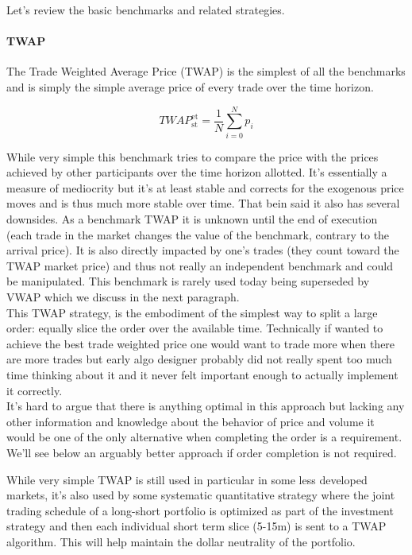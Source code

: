 Let's review the basic benchmarks and related strategies.

\paragraph{TWAP}
The Trade Weighted Average Price (TWAP) is the simplest of all the benchmarks and is simply the simple average price of every trade over the time horizon. 

\begin{equation}
	\mathit{TWAP}_{\text{st}} ^{\text{et}}= \frac{1}{N}\sum_{i=0}^N{p_i}
\end{equation}

While very simple this benchmark tries to compare the price with the prices achieved by other participants over the time horizon allotted. It's essentially a measure of mediocrity but it's at least stable and corrects for the exogenous price moves and is thus much more stable over time. That bein said it also has several downsides. As a benchmark TWAP it is unknown until the end of execution (each trade in the market changes the value of the benchmark, contrary to the arrival price). It is also directly impacted by one's trades (they count toward the TWAP market price) and thus not really an independent benchmark and could be manipulated. This benchmark is rarely used today being superseded by VWAP which we discuss in the next paragraph.\\

This TWAP strategy, is the embodiment of the simplest way to split a large order: equally slice the order over the available time. Technically if wanted to achieve the best trade weighted price one would want to trade more when there are more trades but early algo designer probably did not really spent too much time thinking about it and it never felt important enough to actually implement it correctly.\\

It's hard to argue that there is anything optimal in this approach but lacking any other information and knowledge about the behavior of price and volume it would be one of the only alternative when completing the order is a requirement. We'll see below an arguably better approach if order completion is not required. 

While very simple TWAP is still used in particular in some less developed markets, it's also used by some systematic quantitative strategy where the joint trading schedule of a long-short portfolio is optimized as part of the investment strategy and then each individual short term slice (5-15m) is sent to a TWAP algorithm. This will help maintain the dollar neutrality of the portfolio.

